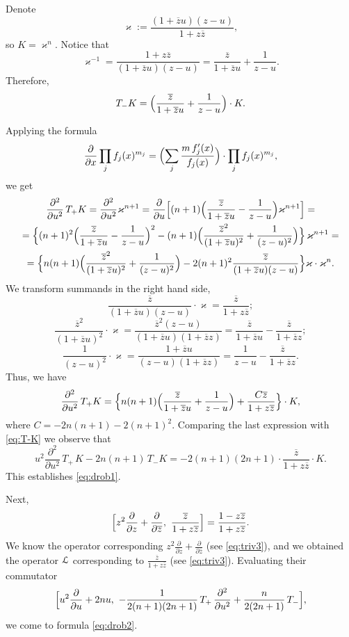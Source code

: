 \documentclass[10pt,a4paper]{amsart}
\def\kappa{\varkappa}
\def\cL{\EuScript L}
\def\ov{\overline}
\def\sm{\smallskip}
\begin{document}
Denote
$$
\kappa:=\frac{(1+\ov z u)(z-u)}{1+z\ov z},
$$
so $K=\kappa^n$.
Notice that 
$$
\kappa^{-1}=
\frac{1+z\ov z}{(1+\ov z u)(z-u)}=\frac{\ov z}{1+ \ov z u}+
\frac1{z-u}.
$$
Therefore,
\begin{equation}
T_- K=\Bigl(\frac{\ov z}{1+ \ov z u}+
\frac1{z-u}\Bigr) \cdot K.
\label{eq:T-K}
\end{equation}

Applying the formula
\begin{equation}
\frac{\partial}{\partial x}\prod_j f_j(x)^{m_j} 
=
\Bigl(\sum_j \frac{m\,  f'_j(x) }{f_j(x)} \Bigr)
\cdot
\prod_j f_j(x)^{m_j}, 
\label{eq:logarithmic}
\end{equation}
we get
\begin{multline}
\frac{\partial^2}{\partial u^2}\, T_+ K
=\frac{\partial^2}{\partial u^2} \kappa^{n+1}=
\frac{\partial}{\partial u}\Bigl[(n+1)\Bigl(\frac{\ov z}{1+\ov z u}-\frac{1}{z-u} \Bigr) \kappa^{n+1}\Bigr]
=\\=
\Bigl\{(n+1)^2\Bigl(\frac{\ov z}{1+\ov z u}-\frac{1}{z-u} \Bigr)^2
-(n+1)\Bigl(\frac{\ov z^2}{(1+\ov z u)^2}+\frac{1}{(z-u)^2} \Bigr)\Bigl\}
\,\kappa^{n+1}
=\\=
\Bigl\{n(n+1)\Bigl(\frac{\ov z^2}{(1+\ov z u)^2}+\frac{1}{(z-u)^2} \Bigr)-2(n+1)^2 \frac{\ov z}{(1+\ov z u)(z-u)}
\Bigr\}\kappa\cdot \kappa^n.
\end{multline}
We transform summands in the right hand side,
$$
\frac{\ov z}{(1+\ov z u)(z-u)}\cdot \kappa=\frac{\ov z}{1+z \ov z};
$$
$$
\frac{\ov z^2}{(1+\ov z u)^2}\cdot \kappa=
\frac{\ov z^2(z-u)}{(1+\ov z u)(1+\ov z z)}
=\frac{\ov z}{1+\ov z u} - \frac{\ov z}{1+\ov z z};
$$
$$
\frac{1}{(z-u)^2}\cdot \kappa =\frac{1+\ov z u}{(z-u)(1+\ov z z)}
=\frac{1}{z-u}-\frac{\ov z}{1+\ov z z}.
$$
Thus, we have
\begin{equation}
\frac{\partial^2}{\partial u^2}\, T_+ K
=\Bigl\{
n(n+1)\Bigl(\frac{\ov z}{1+\ov z u}+ \frac{1}{z-u}\Bigr)
+ \frac{C\ov z}{1+z\ov z}
\Bigr\}\cdot K,
\label{eq:partial2K}
\end{equation}
where $C=-2n(n+1)-2(n+1)^2$. Comparing the last expression
with \eqref{eq:T-K} we observe that
$$
u^2\frac{\partial^2}{\partial u^2}\,T_+\, K-2n(n+1) \,T_- K=
-2(n+1)(2n+1)\cdot \frac{\ov z}{1+z \ov z}\cdot K.
$$
This establishes \eqref{eq:drob1}.

\sm

Next,
$$
\Bigl[z^2\frac{\partial}{\partial z}+\frac{\partial}{\partial \ov z},\,\,
\frac{\ov z}{1+z \ov z}\Bigr]=\frac{1 - z\ov z}{1+z \ov z}.
$$
We know the operator corresponding $z^2\frac{\partial}{\partial z}+\frac{\partial}{\partial \ov z}$  (see \eqref{eq:triv3}),
and we obtained the operator $\cL$ corresponding to $\frac{\ov z}{1+z \ov z}$
(see \eqref{eq:triv3}). Evaluating their commutator
$$
\Bigl[u^2 \frac{\partial}{\partial u}+2nu,\,\,
-\frac1{2(n+1)(2n+1)}\, T_+\, \frac{\partial^2}{\partial u^2}
+\frac{n}{2(2n+1)}\,T_-\Bigr],
$$
we come to  formula \eqref{eq:drob2}.
\end{document}
